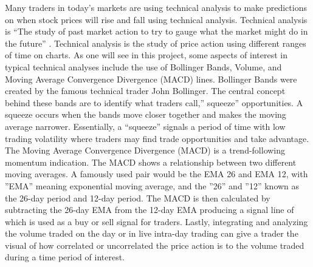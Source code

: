 \documentclass{article}
\begin{document}
Many traders in today’s markets are using technical analysis to make predictions on when stock prices will rise and fall using technical analysis. Technical analysis is “The study of past market action to try to gauge what the market might do in the future” \cite{Fidelity}. Technical analysis is the study of price action using different ranges of time on charts. As one will see in this project, some aspects of interest in typical technical analyses include the use of Bollinger Bands, Volume, and Moving Average Convergence Divergence (MACD) lines. Bollinger Bands were created by the famous technical trader John Bollinger. The central concept behind these bands are to identify what traders call,” squeeze” opportunities. A squeeze occurs when the bands move closer together and makes the moving average narrower. Essentially, a “squeeze” signals a period of time with low trading volatility where traders may find trade opportunities and take advantage. The Moving Average Convergence Divergence (MACD) is a trend-following momentum indication. The MACD shows a relationship between two different moving averages. A famously used pair would be the EMA 26 and EMA 12, with ”EMA” meaning exponential moving average, and the ”26” and ”12” known as the 26-day period and 12-day period. The MACD is then calculated by subtracting the 26-day EMA from the 12-day EMA producing a signal line of which is used as a buy or sell signal for traders. Lastly, integrating and analyzing the volume traded on the day or in live intra-day trading can give a trader the visual of how correlated or uncorrelated the price action is to the volume traded during a time period of interest.
\\
\end{document}
